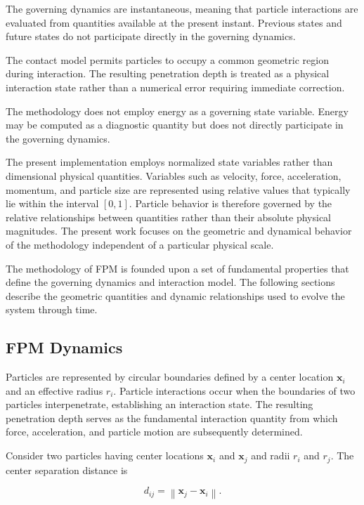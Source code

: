 The governing dynamics are instantaneous, meaning that
particle interactions are evaluated from quantities
available at the present instant. Previous states and
future states do not participate directly in the
governing dynamics.

The contact model permits particles to occupy a common
geometric region during interaction. The resulting
penetration depth is treated as a physical interaction
state rather than a numerical error requiring immediate
correction.

The methodology does not employ energy as a governing
state variable. Energy may be computed as a diagnostic
quantity but does not directly participate in the
governing dynamics.

The present implementation employs normalized state variables 
rather than dimensional physical quantities. Variables such as 
velocity, force, acceleration, momentum, and particle size are 
represented using relative values that typically lie within the 
interval $[0,1]$. Particle behavior is therefore governed by the 
relative relationships between quantities rather than their absolute 
physical magnitudes. The present work focuses on the geometric 
and dynamical behavior of the methodology independent of a 
particular physical scale.

The methodology of FPM is founded upon a set of
fundamental properties that define the governing
dynamics and interaction model. The following sections 
describe the geometric quantities and 
dynamic relationships used to evolve the system 
through time.


\subsection{FPM Dynamics}

Particles are represented by circular boundaries
defined by a center location $\mathbf{x}_i$ and an
effective radius $r_i$. Particle interactions occur
when the boundaries of two particles interpenetrate,
establishing an interaction state. The resulting penetration 
depth serves as the fundamental interaction quantity 
from which force, acceleration, and particle motion 
are subsequently determined.

Consider two particles having center locations
$\mathbf{x}_i$ and $\mathbf{x}_j$ and radii
$r_i$ and $r_j$. The center separation distance is

\begin{equation}
d_{ij}
=
\left\|
\mathbf{x}_j-\mathbf{x}_i
\right\|.
\end{equation}

